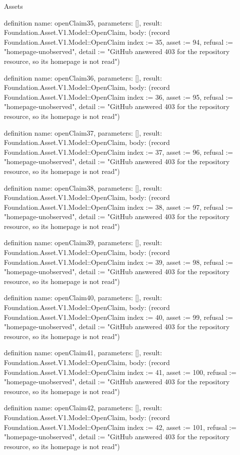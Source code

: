 \begin{lexlean}{Assets}
\begin{semanticmodule}
definition{
  name: openClaim35,
  parameters: [],
  result: Foundation.Asset.V1.Model::OpenClaim,
  body: (record Foundation.Asset.V1.Model::OpenClaim {index := 35, asset := 94, refusal := "homepage-unobserved", detail := "GitHub answered 403 for the repository resource, so its homepage is not read"})
}

definition{
  name: openClaim36,
  parameters: [],
  result: Foundation.Asset.V1.Model::OpenClaim,
  body: (record Foundation.Asset.V1.Model::OpenClaim {index := 36, asset := 95, refusal := "homepage-unobserved", detail := "GitHub answered 403 for the repository resource, so its homepage is not read"})
}

definition{
  name: openClaim37,
  parameters: [],
  result: Foundation.Asset.V1.Model::OpenClaim,
  body: (record Foundation.Asset.V1.Model::OpenClaim {index := 37, asset := 96, refusal := "homepage-unobserved", detail := "GitHub answered 403 for the repository resource, so its homepage is not read"})
}

definition{
  name: openClaim38,
  parameters: [],
  result: Foundation.Asset.V1.Model::OpenClaim,
  body: (record Foundation.Asset.V1.Model::OpenClaim {index := 38, asset := 97, refusal := "homepage-unobserved", detail := "GitHub answered 403 for the repository resource, so its homepage is not read"})
}

definition{
  name: openClaim39,
  parameters: [],
  result: Foundation.Asset.V1.Model::OpenClaim,
  body: (record Foundation.Asset.V1.Model::OpenClaim {index := 39, asset := 98, refusal := "homepage-unobserved", detail := "GitHub answered 403 for the repository resource, so its homepage is not read"})
}

definition{
  name: openClaim40,
  parameters: [],
  result: Foundation.Asset.V1.Model::OpenClaim,
  body: (record Foundation.Asset.V1.Model::OpenClaim {index := 40, asset := 99, refusal := "homepage-unobserved", detail := "GitHub answered 403 for the repository resource, so its homepage is not read"})
}

definition{
  name: openClaim41,
  parameters: [],
  result: Foundation.Asset.V1.Model::OpenClaim,
  body: (record Foundation.Asset.V1.Model::OpenClaim {index := 41, asset := 100, refusal := "homepage-unobserved", detail := "GitHub answered 403 for the repository resource, so its homepage is not read"})
}

definition{
  name: openClaim42,
  parameters: [],
  result: Foundation.Asset.V1.Model::OpenClaim,
  body: (record Foundation.Asset.V1.Model::OpenClaim {index := 42, asset := 101, refusal := "homepage-unobserved", detail := "GitHub answered 403 for the repository resource, so its homepage is not read"})
}


\end{semanticmodule}
\end{lexlean}
